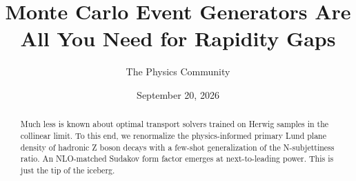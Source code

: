 \documentclass[11pt]{article}
\title{Monte Carlo Event Generators Are All You Need for Rapidity Gaps}
\author{The Physics Community}
\date{September 20, 2026}
\begin{document}
\maketitle
\begin{abstract}
Much less is known about optimal transport solvers trained on Herwig
samples in the collinear limit. To this end, we renormalize the
physics-informed primary Lund plane density of hadronic Z boson decays
with a few-shot generalization of the N-subjettiness ratio. An
NLO-matched Sudakov form factor emerges at next-to-leading power. This
is just the tip of the iceberg.
\end{abstract}
\tableofcontents





\nocite{*}


\end{document}
